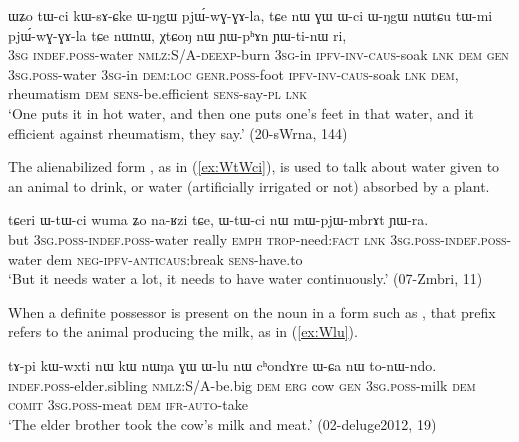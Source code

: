   \begin{exe}
\ex \label{ex:Wci}
 \gll  ɯʑo tɯ-ci kɯ-sɤ-ɕke ɯ-ŋgɯ pjɯ́-wɣ-ɣɤ-la, tɕe nɯ ɣɯ ɯ-ci ɯ-ŋgɯ nɯtɕu tɯ-mi pjɯ́-wɣ-ɣɤ-la tɕe nɯnɯ, χtɕoŋ nɯ ɲɯ-pʰɤn ɲɯ-ti-nɯ ri, \\
\textsc{3sg}  \textsc{indef.poss}-water \textsc{nmlz}:S/A-\textsc{deexp}-burn \textsc{3sg}-in \textsc{ipfv}-\textsc{inv}-\textsc{caus}-soak \textsc{lnk} \textsc{dem} \textsc{gen} \textsc{3sg.poss}-water \textsc{3sg}-in \textsc{dem:loc}  \textsc{genr.poss}-foot  \textsc{ipfv}-\textsc{inv}-\textsc{caus}-soak \textsc{lnk} \textsc{dem}, rheumatism \textsc{dem} \textsc{sens}-be.efficient \textsc{sens}-say-\textsc{pl} \textsc{lnk}  \\
 \glt `One puts it in hot water, and then one puts one's feet in that water, and it efficient against rheumatism, they say.' (20-sWrna, 144)
 \end{exe}

The alienabilized form , as in (\ref{ex:WtWci}), is used to talk about water given to an animal to drink, or water (artificially irrigated or not) absorbed by a plant.

 \begin{exe}
\ex \label{ex:WtWci}
 \gll  tɕeri ɯ-tɯ-ci wuma ʑo na-ʁzi tɕe, ɯ-tɯ-ci nɯ mɯ-pjɯ-mbrɤt ɲɯ-ra. \\
 but \textsc{3sg.poss}-\textsc{indef.poss}-water really \textsc{emph} \textsc{trop}-need:\textsc{fact} \textsc{lnk} \textsc{3sg.poss}-\textsc{indef.poss}-water dem \textsc{neg-ipfv-anticaus}:break \textsc{sens}-have.to \\
 \glt  `But it needs water a lot, it needs to have water continuously.'  (07-Zmbri, 11)
 \end{exe}
 
 When a definite possessor is present on the noun  in a form such as , that prefix refers to the animal producing the milk, as in (\ref{ex:Wlu}).
 
 \begin{exe}
\ex \label{ex:Wlu}
 \gll 
tɤ-pi kɯ-wxti nɯ kɯ nɯŋa ɣɯ ɯ-lu nɯ cʰondɤre  ɯ-ɕa nɯ to-nɯ-ndo. \\
\textsc{indef.poss}-elder.sibling \textsc{nmlz}:S/A-be.big \textsc{dem} \textsc{erg} cow \textsc{gen} \textsc{3sg.poss}-milk \textsc{dem} \textsc{comit} \textsc{3sg.poss}-meat \textsc{dem} \textsc{ifr}-\textsc{auto}-take \\
\glt `The elder brother took the cow's milk and meat.' (02-deluge2012, 19)
 \end{exe}

